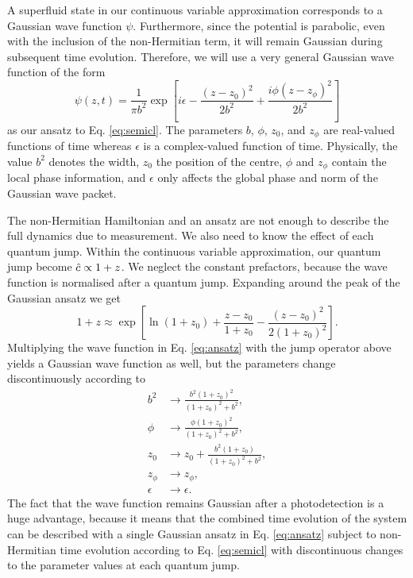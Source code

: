 A superfluid state in our continuous variable approximation
corresponds to a Gaussian wave function $\psi$. Furthermore, since the
potential is parabolic, even with the inclusion of the non-Hermitian
term, it will remain Gaussian during subsequent time
evolution. Therefore, we will use a very general Gaussian wave function
of the form
\begin{equation}
  \label{eq:ansatz}
  \psi(z, t) = \frac{1}{\pi b^2}\exp\left[ i \epsilon 
  - \frac{(z - z_0)^2} {2 b^2} + \frac{i \phi (z - z_\phi)^2} {2 b^2} \right]
\end{equation}
as our ansatz to Eq. \eqref{eq:semicl}. The parameters $b$, $\phi$,
$z_0$, and $z_\phi$ are real-valued functions of time whereas
$\epsilon$ is a complex-valued function of time. Physically, the value
$b^2$ denotes the width, $z_0$ the position of the centre, $\phi$ and
$z_\phi$ contain the local phase information, and $\epsilon$ only
affects the global phase and norm of the Gaussian wave packet.

The non-Hermitian Hamiltonian and an ansatz are not enough to describe
the full dynamics due to measurement. We also need to know the effect
of each quantum jump. Within the continuous variable approximation,
our quantum jump become $\hat{c} \propto 1 + z$. We neglect the constant
prefactors, because the wave function is normalised after a quantum
jump. Expanding around the peak of the Gaussian ansatz we get
\begin{equation}
  1 + z \approx \exp \left[ \ln (1 + z_0) + \frac{z - z_0}{1 + z_0} -
    \frac{(z - z_0)^2}{2 (1 + z_0)^2} \right].
\end{equation}
Multiplying the wave function in Eq. \eqref{eq:ansatz} with the jump
operator above yields a Gaussian wave function as well, but the
parameters change discontinuously according to
\begingroup
\allowdisplaybreaks
\begin{align}
  \label{eq:jumpb2}
  b^2 & \rightarrow \frac{ b^2 (1 + z_0)^2 } { (1 + z_0)^2 + b^2 }, \\
  \phi & \rightarrow \frac{ \phi (1 + z_0)^2 } { (1 + z_0)^2 + b^2 }, \\
  \label{eq:jumpz0}
  z_0 & \rightarrow z_0 + \frac{ b^2 (1 + z_0) } { (1 + z_0)^2 + b^2}, \\
  z_\phi & \rightarrow z_\phi, \\
  \epsilon & \rightarrow \epsilon.
\end{align}
\endgroup
The fact that the wave function remains Gaussian after a photodetection
is a huge advantage, because it means that the combined time evolution
of the system can be described with a single Gaussian ansatz in
Eq. \eqref{eq:ansatz} subject to non-Hermitian time evolution
according to Eq. \eqref{eq:semicl} with discontinuous changes to the
parameter values at each quantum jump.

